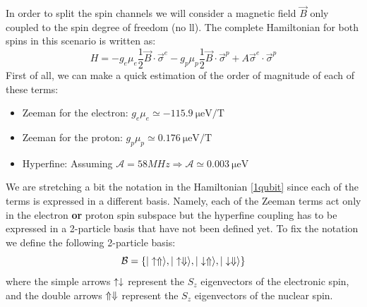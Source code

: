 In order to split the spin channels we will consider a magnetic field $\vec{B}$ only coupled to the spin degree of freedom (no \ac{ll}). The complete Hamiltonian for both spins in this scenario is written as:
\begin{equation}
  H = -g_e\mu_e\frac{1}{2}\vec{B}\cdot\vec{\sigma}^e
      -g_p\mu_p\frac{1}{2}\vec{B}\cdot\vec{\sigma}^p
      +A\vec{\sigma}^e\cdot\vec{\sigma}^p
\label{1qubit}
\end{equation}
First of all, we can make a quick estimation of the order of magnitude of each of these terms:
\begin{itemize}
  \item Zeeman for the electron: $g_e\mu_e\simeq\SI{-115.9}{\micro\eV\per\tesla}$
  \item Zeeman for the proton: $g_p\mu_p\simeq\SI{0.176}{\micro\eV\per\tesla}$
  \item Hyperfine: Assuming
  $\mathcal{A}=58MHz\Rightarrow\mathcal{A}\simeq\SI{0.003}{\micro\eV}$
\end{itemize}
We are stretching a bit the notation in the Hamiltonian \eqref{1qubit} since each of the terms is expressed in a different basis. Namely, each of the Zeeman terms act only in the electron \textbf{or} proton spin subspace but the hyperfine coupling has to be expressed in a 2-particle basis that have not been defined yet.
To fix the notation we define the following 2-particle basis:
\begin{equation}
  \mathcal{B}=\left\{|\uparrow\Uparrow\rangle,|\uparrow\Downarrow\rangle,
                     |\downarrow\Uparrow\rangle,|\downarrow\Downarrow\rangle\right\}
\label{basis}
\end{equation}
where the simple arrows $\uparrow\downarrow$ represent the $S_z$ eigenvectors of the electronic spin, and the double arrows $\Uparrow\Downarrow$ represent the $S_z$ eigenvectors of the nuclear spin.

